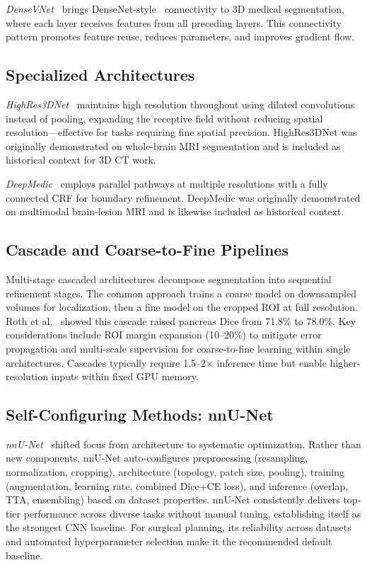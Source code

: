 \emph{DenseVNet}~\cite{gibson2018densevnet} brings DenseNet-style~\cite{huang2017densely} connectivity to 3D medical segmentation, where each layer receives features from all preceding layers. This connectivity pattern promotes feature reuse, reduces parameters, and improves gradient flow.

\subsection{Specialized Architectures}

\emph{HighRes3DNet}~\cite{li2017highres3dnet} maintains high resolution throughout using dilated convolutions instead of pooling, expanding the receptive field without reducing spatial resolution---effective for tasks requiring fine spatial precision. HighRes3DNet was originally demonstrated on whole-brain MRI segmentation and is included as historical context for 3D CT work.

\emph{DeepMedic}~\cite{kamnitsas2017deepmedic} employs parallel pathways at multiple resolutions with a fully connected CRF for boundary refinement. DeepMedic was originally demonstrated on multimodal brain-lesion MRI and is likewise included as historical context.

\subsection{Cascade and Coarse-to-Fine Pipelines}
\label{sec:cascades}

Multi-stage cascaded architectures decompose segmentation into sequential refinement stages. The common approach trains a coarse model on downsampled volumes for localization, then a fine model on the cropped ROI at full resolution. Roth et al.~\cite{roth2017hierarchical, roth2018cascaded} showed this cascade raised pancreas Dice from 71.8\% to 78.0\%. Key considerations include ROI margin expansion (10--20\%) to mitigate error propagation and multi-scale supervision for coarse-to-fine learning within single architectures. Cascades typically require 1.5--2$\times$ inference time but enable higher-resolution inputs within fixed GPU memory.

\subsection{Self-Configuring Methods: nnU-Net}

\emph{nnU-Net}~\cite{isensee2021nnunet} shifted focus from architecture to systematic optimization. Rather than new components, nnU-Net auto-configures preprocessing (resampling, normalization, cropping), architecture (topology, patch size, pooling), training (augmentation, learning rate, combined Dice+CE loss), and inference (overlap, TTA, ensembling) based on dataset properties. nnU-Net consistently delivers top-tier performance across diverse tasks without manual tuning, establishing itself as the strongest CNN baseline. For surgical planning, its reliability across datasets and automated hyperparameter selection make it the recommended default baseline.

